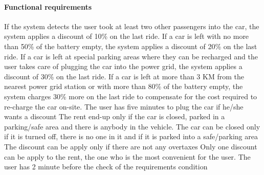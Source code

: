 \paragraph{Functional requirements }
\begin{itemize}
	 If the system detects the user took at least two other passengers into the car, the system applies a discount of 10\% on the last ride.
	 If a car is left with no more than 50\% of the battery empty, the system applies a discount of 20\% on the last ride.
	 If a car is left at special parking areas where they can be recharged and the user takes care of plugging the car into the power grid, the system applies a discount of 30\% on the last ride.
	 If a car is left at more than 3 KM from the nearest power grid station or with more than 80\% of the battery empty, the system charges 30\% more on the last ride to compensate for the cost required to re-charge the car on-site.
	 The user has five minutes to plug the car if he/she wants a discount
	 The rent end-up only if the car is closed, parked in a parking/safe area and there is anybody in the vehicle.
	 The car can be closed only if it is turned off, there is no one in it and if it is parked into a safe/parking area
	 The discount can be apply only if there are not any overtaxes
	 Only one discount can be apply to the rent, the one who is the most convenient for the user.
	 The user has 2 minute before the check of the requirements condition
\end{itemize}
\newpage

